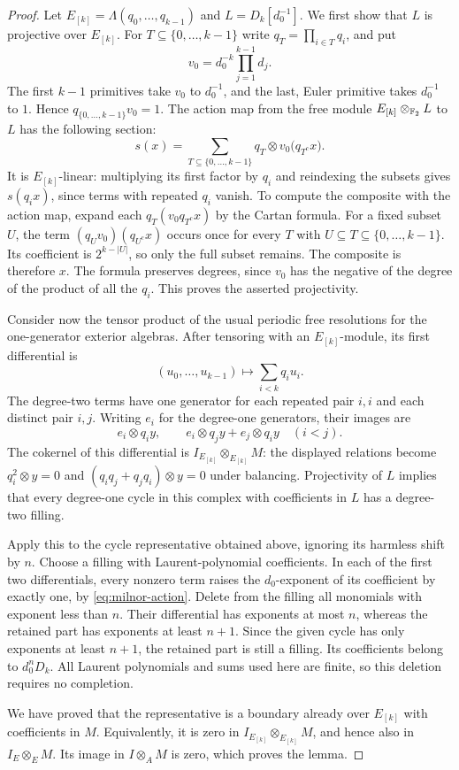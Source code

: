 \begin{proof}
Let $E_{[k]}=\Lambda(q_0,\ldots,q_{k-1})$ and
$L=D_k[d_0^{-1}]$.  We first show that $L$ is projective over
$E_{[k]}$.  For $T\subseteq\{0,\ldots,k-1\}$ write
$q_T=\prod_{i\in T}q_i$, and put
\[
 v_0=d_0^{-k}\prod_{j=1}^{k-1}d_j.
\]
The first $k-1$ primitives take $v_0$ to $d_0^{-1}$, and the last,
Euler primitive takes $d_0^{-1}$ to $1$.  Hence
$q_{\{0,\ldots,k-1\}}v_0=1$.
The action map from the free module $E_{[k]}\otimes_{\mathbb F_2}L$ to $L$
has the following section:
\begin{equation}\label{eq:algebra-projective-section}
 s(x)=\sum_{T\subseteq\{0,\ldots,k-1\}}
        q_T\otimes v_0\bigl(q_{T^c}x\bigr).
\end{equation}
It is $E_{[k]}$-linear: multiplying its first factor by $q_i$ and
reindexing the subsets gives $s(q_ix)$, since terms with repeated
$q_i$ vanish.  To compute the composite with the action map, expand
each $q_T(v_0q_{T^c}x)$ by the Cartan formula.  For a fixed subset $U$,
the term $(q_Uv_0)(q_{U^c}x)$ occurs once for every $T$ with
$U\subseteq T\subseteq\{0,\ldots,k-1\}$.  Its coefficient is
$2^{k-|U|}$, so only the full subset remains.  The composite is
therefore $x$.  The formula preserves degrees, since $v_0$ has the
negative of the degree of the product of all the $q_i$.
This proves the asserted projectivity.

Consider now the tensor product of the usual periodic free resolutions
for the one-generator exterior algebras.  After tensoring with an
$E_{[k]}$-module, its first differential is
\[
 (u_0,\ldots,u_{k-1})\longmapsto\sum_{i<k}q_iu_i.
\]
The degree-two terms have one generator for each repeated pair $i,i$
and each distinct pair $i,j$. Writing $e_i$ for the degree-one
generators, their images are
\[
 e_i\otimes q_i y,\qquad
 e_i\otimes q_jy+e_j\otimes q_iy\quad(i<j).
\]
The cokernel of this differential is
$I_{E_{[k]}}\otimes_{E_{[k]}}M$: the displayed relations become
$q_i^2\otimes y=0$ and
$(q_iq_j+q_jq_i)\otimes y=0$ under balancing.
Projectivity of $L$ implies that every degree-one
cycle in this complex with coefficients in $L$ has a degree-two
filling.

Apply this to the cycle representative obtained above, ignoring its
harmless shift by $n$.  Choose a filling with Laurent-polynomial
coefficients.  In each of the first two differentials, every nonzero
term raises the $d_0$-exponent of its coefficient by exactly one, by
\eqref{eq:milnor-action}.  Delete from the filling all monomials with
exponent less than $n$.  Their differential has exponents at most $n$,
whereas the retained part has exponents at least $n+1$.
Since the given cycle has only exponents at least $n+1$, the retained
part is still a filling.  Its coefficients belong to $d_0^nD_k$.
All Laurent polynomials and sums used here are finite, so this deletion
requires no completion.

We have proved that the representative is a boundary already over
$E_{[k]}$ with coefficients in $M$.  Equivalently, it is zero in
$I_{E_{[k]}}\otimes_{E_{[k]}}M$, and hence also in
$I_E\otimes_EM$.  Its image in $I\otimes_AM$ is zero, which proves
the lemma.
\end{proof}

